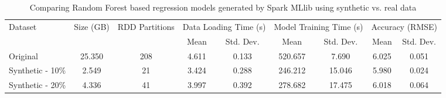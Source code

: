 \begin{table*}
    \renewcommand{\arraystretch}{1.3}
    \caption{Comparing Random Forest based regression models generated by Spark MLlib using synthetic vs. real data \vspace{-1em}}
    \label{tab:spark-rf}
    \begin{center}
        \begin{tabularx}{\textwidth}{|X|c|c|c|c|c|c|c|c|}
            \hline
            \multirow{2}{*}{Dataset} & \multirow{2}{*}{Size (GB)} & \multirow{2}{*}{RDD Partitions} & \multicolumn{2}{c|}{\cellcolor[gray]{0.7}Data Loading Time (s)} &\multicolumn{2}{c|}{\cellcolor[gray]{0.7}Model Training Time (s)} & \multicolumn{2}{c|}{\cellcolor[gray]{0.7}Accuracy (RMSE)}\\
            \cline{4-9}
             & & & \cellcolor[gray]{0.9}Mean & \cellcolor[gray]{0.9}Std. Dev.  &  \cellcolor[gray]{0.9}Mean & \cellcolor[gray]{0.9}Std. Dev. &  \cellcolor[gray]{0.9}Mean & \cellcolor[gray]{0.9}Std. Dev. \\
            \hline
            Original & 25.350 & 208 & 4.611 & 0.133 & 520.657 & 7.690 & 6.025 & 0.051 \\
            \hline
            Synthetic - 10\% & 2.549 & 21 & 3.424 & 0.288 & 246.212 & 15.046 & 5.980 & 0.024 \\
            \hline
            Synthetic - 20\% & 4.336 & 41 & 3.997 & 0.392 & 278.682 & 17.475 & 6.018 & 0.064 \\
            \hline
		\end{tabularx}
	\end{center}
    \vspace{-1em}
\end{table*}


